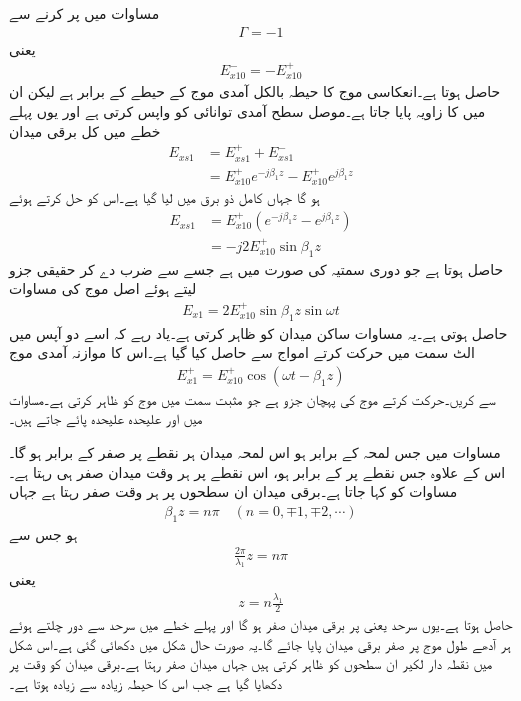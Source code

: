 مساوات  میں  پر کرنے سے
\begin{align*}
\Gamma=-1
\end{align*}
یعنی
\begin{align*}
E_{x10}^-=-E_{x10}^+
\end{align*}
حاصل ہوتا ہے۔انعکاسی موج کا حیطہ بالکل آمدی موج کے حیطے کے برابر ہے لیکن ان میں  کا زاویہ پایا جاتا ہے۔موصل سطح آمدی توانائی کو واپس کرتی ہے اور یوں پہلے خطے میں کل برقی میدان
\begin{align*}
E_{xs1}&=E_{xs1}^+ +E_{xs1}^-\\
&=E_{x10}^+ e^{-j \beta_1 z}-E_{x10}^+ e^{j \beta_1 z}
\end{align*}
ہو گا جہاں کامل ذو برق میں  لیا گیا ہے۔اس کو حل کرتے ہوئے
\begin{align*}
E_{xs1}&=E_{x10}^+ \left(e^{-j \beta_1 z}-e^{j\beta_1 z} \right)\\
&=-j 2 E_{x10}^+ \sin \beta_1 z
\end{align*}
حاصل ہوتا ہے جو دوری سمتیہ کی صورت میں ہے جسے  سے ضرب دے کر حقیقی جزو لیتے ہوئے اصل موج کی مساوات
\begin{align}\label{مساوات_موج_دو_امواج_برابر_ساکن_موج}
E_{x1}=2 E_{x10}^+ \sin \beta_1 z \sin \omega t
\end{align}
حاصل ہوتی ہے۔یہ مساوات ساکن میدان کو ظاہر کرتی ہے۔یاد رہے کہ اسے دو آپس میں الٹ سمت میں حرکت کرتے امواج سے حاصل کیا گیا ہے۔اس کا موازنہ آمدی موج
\begin{align*}
E_{x1}^+=E_{x10}^+ \cos (\omega t - \beta_1 z)
\end{align*}
سے کریں۔حرکت کرتے موج کی پہچان جزو  ہے جو مثبت سمت میں موج کو ظاہر کرتی ہے۔مساوات  میں  اور  علیحدہ علیحدہ پائے جاتے ہیں۔

مساوات  میں جس لمحہ  کے برابر ہو اس لمحہ میدان ہر نقطے پر صفر کے برابر ہو گا۔اس کے علاوہ جس نقطے پر   کے برابر ہو، اس نقطے پر ہر وقت میدان صفر ہی رہتا ہے۔مساوات  کو  کہا جاتا ہے۔برقی میدان ان سطحوں پر ہر وقت صفر رہتا ہے جہاں
\begin{align*}
\beta_1 z = n\pi \quad (n=0,\mp 1, \mp 2, \cdots)
\end{align*}
ہو جس سے
\begin{align*}
\frac{2\pi}{\lambda_1} z =n \pi
\end{align*}
یعنی
\begin{align*}
z=n\frac{\lambda_1}{2}
\end{align*}
حاصل ہوتا ہے۔یوں سرحد یعنی  پر برقی میدان صفر ہو گا اور پہلے خطے میں سرحد سے دور چلتے ہوئے ہر آدھے  طول موج پر صفر برقی میدان پایا جائے گا۔یہ صورت حال شکل  میں دکھائی گئی ہے۔اس شکل میں نقطہ دار لکیر ان سطحوں کو ظاہر کرتی ہیں جہاں میدان صفر رہتا ہے۔برقی میدان کو وقت  پر دکھایا گیا ہے جب اس کا حیطہ زیادہ سے زیادہ ہوتا ہے۔ 

